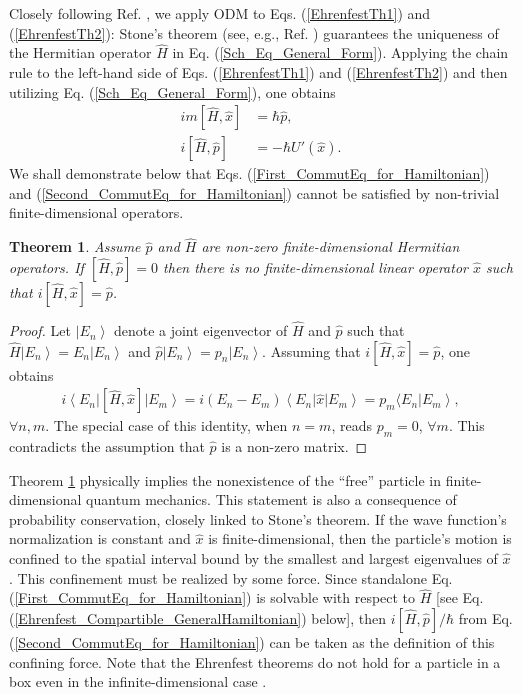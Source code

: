 \documentclass[twocolumn,pra,aps,showpacs,preprintnumbers,nofootinbib, superscriptaddress, amsmath,amssymb]{revtex4}
\newcommand*{\bra}[1]{\left\langle{#1}\right|}
\newcommand*{\ket}[1]{\left| #1 \right\rangle}
\newcommand*{\commut}[1]{[ #1 ]}
\newtheorem{theorem}{Theorem}
\begin{document}
Closely following Ref. \cite{Bondar2011c}, we apply ODM to Eqs. (\ref{EhrenfestTh1}) and (\ref{EhrenfestTh2}): Stone's theorem (see, e.g., Ref. \cite{Reed1980, Araujo2008})  
guarantees the uniqueness of the Hermitian operator $\hat{H}$ in Eq. (\ref{Sch_Eq_General_Form}). Applying the chain rule to the left-hand side of Eqs. (\ref{EhrenfestTh1}) and (\ref{EhrenfestTh2}) and then utilizing Eq. (\ref{Sch_Eq_General_Form}), one obtains
\begin{align}
	im \commut{\hat{H}, \hat{x}} &= \hbar \hat{p},  \label{First_CommutEq_for_Hamiltonian} \\
	i\commut{\hat{H}, \hat{p}} &= -\hbar U'(\hat{x}). \label{Second_CommutEq_for_Hamiltonian}
\end{align}    
We shall demonstrate below that Eqs. (\ref{First_CommutEq_for_Hamiltonian}) and (\ref{Second_CommutEq_for_Hamiltonian}) cannot be satisfied by non-trivial finite-dimensional operators.    

\begin{theorem}\label{NoFreeFiniteDimQM_Theorem}
	Assume $\hat{p}$ and $\hat{H}$ are non-zero finite-dimensional Hermitian operators. If $\commut{ \hat{H}, \hat{p} } = 0$ then there is no finite-dimensional linear operator $\hat{x}$ such that $i \commut{ \hat{H}, \hat{x} } = \hat{p}$.
\end{theorem}
\begin{proof}
	Let $\ket{E_n}$ denote a joint eigenvector of $\hat{H}$ and $\hat{p}$ such that $\hat{H} \ket{E_n} = E_n \ket{E_n}$ and $\hat{p} \ket{E_n} = p_n \ket{E_n}$. Assuming that $i \commut{ \hat{H}, \hat{x} } = \hat{p}$, one obtains 
	\begin{align}
		i \bra{E_n} \commut{ \hat{H}, \hat{x} } \ket{E_m} = i (E_n - E_m) \bra{E_n} \hat{x} \ket{E_m} = p_m \langle E_n \ket{E_m}, 
	\end{align}
	$\forall n,m$.
	The special case of this identity, when $n=m$, reads $p_m = 0$, $\forall m$. This contradicts the assumption that $\hat{p}$ is a non-zero matrix.
\end{proof}

Theorem \ref{NoFreeFiniteDimQM_Theorem} physically implies the nonexistence of the ``free'' particle in finite-dimensional quantum mechanics. This statement is also a consequence of probability conservation, closely linked to Stone's theorem. If the wave function's normalization is constant and $\hat{x}$ is finite-dimensional, then the particle's motion is confined to the spatial interval bound by the smallest and largest eigenvalues of $\hat{x}$. This confinement must be realized by some force. Since standalone Eq. (\ref{First_CommutEq_for_Hamiltonian}) is solvable with respect to $\hat{H}$ [see Eq. (\ref{Ehrenfest_Compartible_GeneralHamiltonian}) below], then $i \commut{ \hat{H}, \hat{p} }/\hbar$ from Eq. (\ref{Second_CommutEq_for_Hamiltonian}) can be taken as the definition of this confining force. Note that the Ehrenfest theorems do not hold for a particle in a box even in the infinite-dimensional case \cite{Alonso2000}.
\end{document}
